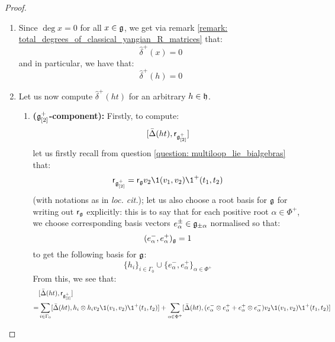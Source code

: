                 \begin{proof}
                    \begin{enumerate}
                        \item Since $\deg x = 0$ for all $x \in \mathfrak{g}$, we get via remark \ref{remark: total_degrees_of_classical_yangian_R_matrices} that:
                            $$\hat{\delta}^+(x) = 0$$
                        and in particular, we have that:
                            $$\hat{\delta}^+(h) = 0$$

                        \item Let us now compute $\hat{\delta}^+(ht)$ for an arbitrary $h \in \mathfrak{h}$. 
                        \begin{enumerate}
                            \item \textbf{($\mathfrak{g}_{[2]}^+$-component):} Firstly, to compute:
                                $$[\bar{\Delta}(ht), \mathsf{r}_{\mathfrak{g}_{[2]}^+}]$$
                            let us firstly recall from question \ref{question: multiloop_lie_bialgebras} that:
                                $$\sfr_{\g_{[2]}^+} = \sfr_{\g} v_2\1(v_1, v_2) \1^+(t_1, t_2)$$
                            (with notations as in \textit{loc. cit.}); let us also choose a root basis for $\mathfrak{g}$ for writing out $\mathsf{r}_{\mathfrak{g}}$ explicitly: this is to say that for each positive root $\alpha \in \Phi^+$, we choose corresponding basis vectors $e_{\alpha}^{\pm} \in \mathfrak{g}_{\pm \alpha}$ normalised so that:
                                $$(e_{\alpha}^-, e_{\alpha}^+)_{\mathfrak{g}} = 1$$
                            to get the following basis for $\mathfrak{g}$:
                                $$\{h_i\}_{i \in \Gamma_0} \cup \{e_{\alpha}^-, e_{\alpha}^+\}_{\alpha \in \Phi^+}$$
                            From this, we see that:
                                $$
                                    \begin{aligned}
                                        & [\bar{\Delta}(ht), \sfr_{\g_{[2]}^+}]
                                        \\
                                        = & \sum_{i \in \Gamma_0} [\bar{\Delta}(ht), h_i \tensor h_i v_2\1(v_1, v_2) \1^+(t_1, t_2)] + \sum_{\alpha \in \Phi^+} [\bar{\Delta}(ht), (e_{\alpha}^- \tensor e_{\alpha}^+ + e_{\alpha}^+ \tensor e_{\alpha}^-) v_2\1(v_1, v_2) \1^+(t_1, t_2)]
                                    \end{aligned}
                                $$


\end{enumerate}
\end{enumerate}
\end{proof}
